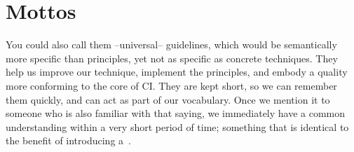 \chapter{Mottos}\label{ch:mottos}


You could also call them --universal-- guidelines, which would be semantically more specific than principles, yet not as specific as concrete techniques.
They help us improve our technique, implement the principles, and embody a quality more conforming to the core of CI\@.
They are kept short, so we can remember them quickly, and can act as part of our vocabulary.
Once we mention it to someone who is also familiar with that saying, we immediately have a common understanding within a very short period of time; something that is identical to the benefit of introducing a~.

